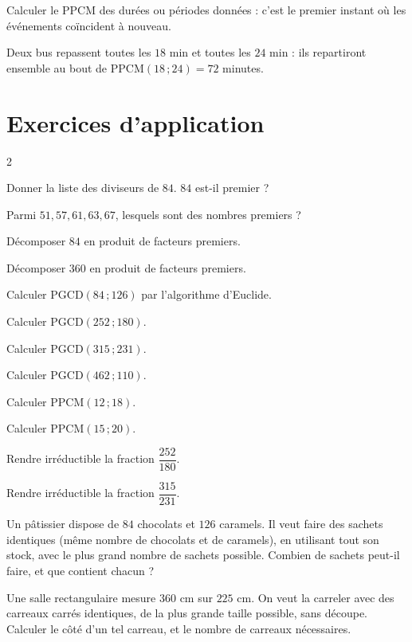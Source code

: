 Calculer le PPCM des durées ou périodes données : c'est le premier instant où les
événements coïncident à nouveau.
\begin{exemple}
Deux bus repassent toutes les $18$ min et toutes les $24$ min : ils repartiront ensemble au
bout de $\text{PPCM}(18\,;24)=72$ minutes.
\end{exemple}

\section{Exercices d'application}
\begin{multicols}{2}

\exo{} Donner la liste des diviseurs de $84$. $84$ est-il premier ?

\exo{} Parmi $51,57,61,63,67$, lesquels sont des nombres premiers ?

\exo{} Décomposer $84$ en produit de facteurs premiers.

\exo{} Décomposer $360$ en produit de facteurs premiers.

\exo{} Calculer $\text{PGCD}(84\,;126)$ par l'algorithme d'Euclide.

\exo{} Calculer $\text{PGCD}(252\,;180)$.

\exo{} Calculer $\text{PGCD}(315\,;231)$.

\exo{} Calculer $\text{PGCD}(462\,;110)$.

\exo{} Calculer $\text{PPCM}(12\,;18)$.

\exo{} Calculer $\text{PPCM}(15\,;20)$.

\exo{} Rendre irréductible la fraction $\dfrac{252}{180}$.

\exo{} Rendre irréductible la fraction $\dfrac{315}{231}$.

\exo{} Un pâtissier dispose de $84$ chocolats et $126$ caramels. Il veut faire des
sachets identiques (même nombre de chocolats et de caramels), en utilisant tout son stock,
avec le plus grand nombre de sachets possible. Combien de sachets peut-il faire, et que
contient chacun ?

\exo{} Une salle rectangulaire mesure $360$ cm sur $225$ cm. On veut la carreler
avec des carreaux carrés identiques, de la plus grande taille possible, sans découpe.
Calculer le côté d'un tel carreau, et le nombre de carreaux nécessaires.


\end{multicols}

